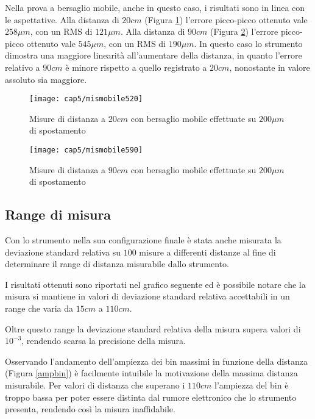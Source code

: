 Nella prova a bersaglio mobile, anche in questo caso, i risultati sono in linea con le aspettative. 
Alla distanza di $20cm$ (Figura \ref{mismobile520}) l'errore picco-picco ottenuto vale $258 \mu m$, con un RMS di $121 \mu m$.
Alla distanza di $90cm$ (Figura \ref{mismobile590}) l'errore picco-picco ottenuto vale $ 545 \mu m$, con un RMS di $ 190 \mu m$.
In questo caso lo strumento dimostra una maggiore linearità all'aumentare della distanza, in quanto l'errore relativo a $90cm$ è minore rispetto a quello registrato a $20cm$, nonostante in valore assoluto sia maggiore.
\begin{figure}[H]  
	\begin{center}
		\texttt{[image: cap5/mismobile520]}
		\caption{Misure di distanza a $20cm$ con bersaglio mobile effettuate su $200 \mu m$ di spostamento}
		\label{mismobile520}
	\end{center}
\end{figure}
\begin{figure}[H] 
	\begin{center}
		\texttt{[image: cap5/mismobile590]}
		\caption{Misure di distanza a $90cm$ con bersaglio mobile effettuate su $200 \mu m$ di spostamento}
		\label{mismobile590}
	\end{center}
\end{figure}

\subsection{Range di misura}
Con lo strumento nella sua configurazione finale è stata anche misurata la deviazione standard relativa su $100$ misure a differenti distanze al fine di determinare il range di distanza misurabile dallo strumento. 


I risultati ottenuti sono riportati nel grafico seguente ed è possibile notare che la misura si mantiene in valori di deviazione standard relativa accettabili in un range che varia da $15cm$ a $110cm$. 

Oltre questo range la deviazione standard relativa della misura supera valori di $10^{-3}$, rendendo scarsa la precisione della misura.

Osservando l'andamento dell'ampiezza dei bin massimi in funzione della distanza (Figura \ref{ampbin}) è facilmente intuibile la motivazione della massima distanza misurabile. Per valori di distanza che superano i $110cm$ l'ampiezza del bin è troppo bassa per poter essere distinta dal rumore elettronico che lo strumento presenta, rendendo così la misura inaffidabile.

